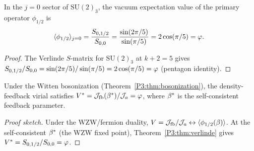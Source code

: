 \begin{theorem}[Verlinde/Cardy formula gives $V^*=\vp$]
\label{P3:thm:verlinde}
In the $j=0$ sector of $\mathrm{SU}(2)_3$, the vacuum expectation value of the
primary operator $\phi_{1/2}$ is
\begin{equation}
  \langle\phi_{1/2}\rangle_{j=0}
  = \frac{S_{0,1/2}}{S_{0,0}}
  = \frac{\sin(2\pi/5)}{\sin(\pi/5)}
  = 2\cos(\pi/5) = \varphi.
  \label{P3:eq:verlinde_phi}
\end{equation}
\end{theorem}
\begin{proof}
The Verlinde $S$-matrix for $\mathrm{SU}(2)_3$ at $k+2=5$ gives
$S_{0,1/2}/S_{0,0} = \sin(2\pi/5)/\sin(\pi/5) = 2\cos(\pi/5) = \varphi$
(pentagon identity).
\end{proof}

\begin{theorem}[Bosonization proof of $V^*=\vp$]
\label{P3:thm:bos_main}
Under the Witten bosonization (Theorem~\ref{P3:thm:bosonization}), the
density-feedback virial satisfies $V^* = \mathcal{J}_{\mathrm{fb}}(\beta^{*})/\mathcal{J}_a = \varphi$,
where $\beta^{*}$ is the self-consistent feedback parameter.
\end{theorem}
\begin{proof}[Proof sketch]
Under the WZW/fermion duality, $V = \mathcal{J}_{\mathrm{fb}}/\mathcal{J}_a \leftrightarrow \langle\phi_{1/2}(\beta)\rangle$.
At the self-consistent $\beta^{*}$ (the WZW fixed point), Theorem~\ref{P3:thm:verlinde}
gives $V^* = S_{0,1/2}/S_{0,0} = \varphi$.
\end{proof}
